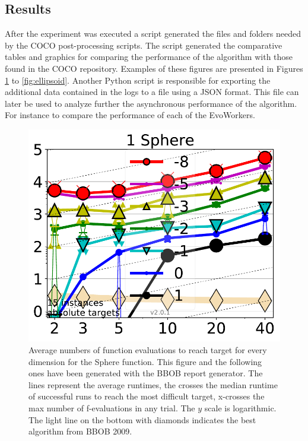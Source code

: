 


\subsection{Results}
\label{sec:results}
After the experiment was executed a script generated 
the files and folders needed by the COCO post-processing 
scripts. The script generated the comparative tables and
graphics for comparing the performance of the algorithm with
those found in the COCO repository. Examples of these figures
are presented in Figures \ref{fig:sphere} to \ref{fig:ellipsoid}.
Another Python script is responsible for exporting the additional 
data contained in the logs to a file using a JSON format. 
This file can later be used to analyze further the asynchronous 
performance of the algorithm.  For instance to compare the 
performance of each of the EvoWorkers.


\begin{figure}[h!t]
    \centering
        \includegraphics[width=5in]{img/Sphere.pdf}
    \caption{Average numbers of function evaluations to reach target
      for every dimension for the Sphere function. This figure and the
    following ones have been generated with the BBOB report
    generator. The lines represent the average runtimes, the crosses
    the median runtime of successful runs to reach the most difficult
    target, x-crosses the max number of f-evaluations in any
    trial. The $y$ scale is logarithmic. The light line on the bottom
    with diamonds indicates the best algorithm from BBOB 2009. }


\label{fig:sphere}
\end{figure}


